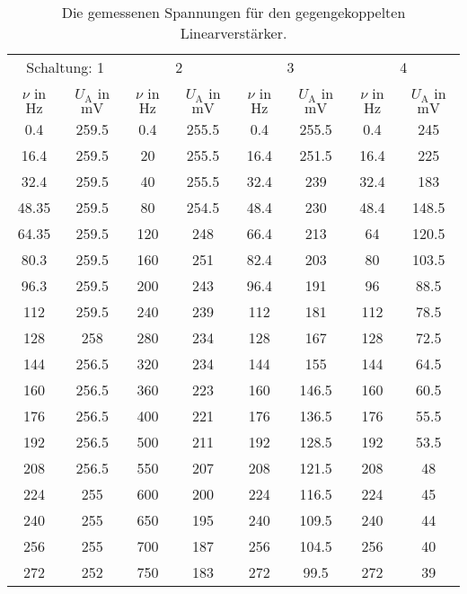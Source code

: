 \documentclass[
  bibliography=totoc,     %
  captions=tableheading,  %
  titlepage=firstiscover, %
]{scrartcl}
\begin{document}
\begin{table}
  \centering
  \caption{Die gemessenen Spannungen für den gegengekoppelten Linearverstärker.}
  \label{tab:messwerte1}
  \begin{tabular}{c c c c c c c c}
    \toprule
    \multicolumn{2}{c}{Schaltung: 1} & \multicolumn{2}{c}{2} & \multicolumn{2}{c}{3} & \multicolumn{2}{c}{4} \\
    $\nu$ in $\si{\hertz}$ & $U_\text{A}$ in $\si{\milli\volt}$ & $\nu$ in $\si{\hertz}$ & $U_\text{A}$ in $\si{\milli\volt}$ & $\nu$ in $\si{\hertz}$ & $U_\text{A}$ in $\si{\milli\volt}$ & $\nu$ in $\si{\hertz}$ & $U_\text{A}$ in $\si{\milli\volt}$ \\
    \midrule
    0.4   & 259.5 & 0.4  & 255.5 & 0.4  & 255.5 & 0.4  & 245   \\
    16.4  & 259.5 & 20   & 255.5 & 16.4 & 251.5 & 16.4 & 225   \\
    32.4  & 259.5 & 40   & 255.5 & 32.4 & 239   & 32.4 & 183   \\
    48.35 & 259.5 & 80   & 254.5 & 48.4 & 230   & 48.4 & 148.5 \\
    64.35 & 259.5 & 120  & 248   & 66.4 & 213   & 64   & 120.5 \\
    80.3  & 259.5 & 160  & 251   & 82.4 & 203   & 80   & 103.5 \\
    96.3  & 259.5 & 200  & 243   & 96.4 & 191   & 96   & 88.5  \\
    112   & 259.5 & 240  & 239   & 112  & 181   & 112  & 78.5  \\
    128   & 258   & 280  & 234   & 128  & 167   & 128  & 72.5  \\
    144   & 256.5 & 320  & 234   & 144  & 155   & 144  & 64.5  \\
    160   & 256.5 & 360  & 223   & 160  & 146.5 & 160  & 60.5  \\
    176   & 256.5 & 400  & 221   & 176  & 136.5 & 176  & 55.5  \\
    192   & 256.5 & 500  & 211   & 192  & 128.5 & 192  & 53.5  \\
    208   & 256.5 & 550  & 207   & 208  & 121.5 & 208  & 48    \\
    224   & 255   & 600  & 200   & 224  & 116.5 & 224  & 45    \\
    240   & 255   & 650  & 195   & 240  & 109.5 & 240  & 44    \\
    256   & 255   & 700  & 187   & 256  & 104.5 & 256  & 40    \\
    272   & 252   & 750  & 183   & 272  & 99.5  & 272  & 39    \\

\end{tabular}
\end{table}
\end{document}
